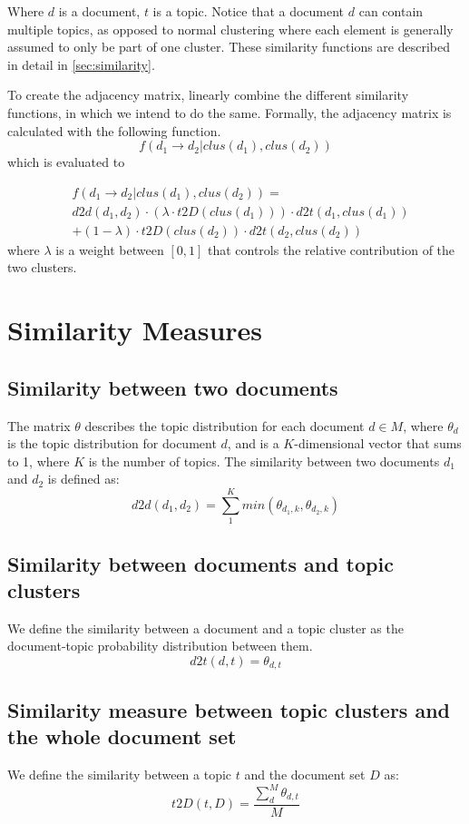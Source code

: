 \noindent
Where $d$ is a document, $t$ is a topic.
Notice that a document $d$ can contain multiple topics, as opposed to normal clustering where each element is generally assumed to only be part of one cluster.
These similarity functions are described in detail in \autoref{sec:similarity}.

To create the adjacency matrix, \cite{ClusterPageRank} linearly combine the different similarity functions, in which we intend to do the same.
Formally, the adjacency matrix is calculated with the following function.
$$ f(d_1 \rightarrow d_2 | clus(d_1), clus(d_2)) $$
which is evaluated to 

\begin{align*}
&f(d_1 \rightarrow d_2 | clus(d_1), clus(d_2)) = \\
&d2d(d_1, d_2) \cdot (\lambda \cdot t2D(clus(d_1))) \cdot d2t(d_1, clus(d_1)) \\ 
&+ (1-\lambda) \cdot t2D(clus(d_2)) \cdot d2t(d_2, clus(d_2))
\end{align*}
where $\lambda$ is a weight between $[0,1]$ that controls the relative contribution of the two clusters.


\section{Similarity Measures}\label{sec:similarity} 
\subsection{Similarity between two documents}
The matrix $\theta$ describes the topic distribution for each document $d \in M$, where $\theta_d$ is the topic distribution for document $d$, and is a $K$-dimensional vector that sums to 1, where $K$ is the number of topics. 
The similarity between two documents $d_1$ and $d_2$ is defined as:
$$ d2d(d_1, d_2) = \sum_{1}^{K} min(\theta_{d_1,k}, \theta_{d_2,k})$$

\subsection{Similarity between documents and topic clusters}
We define the similarity between a document and a topic cluster as the document-topic probability distribution between them.
$$ d2t(d,t) = \theta_{d,t}$$

\subsection{Similarity measure between topic clusters and the whole document set}
We define the similarity between a topic $t$ and the document set $D$ as:
$$ t2D(t, D) = \frac{\sum_{d}^{M} \theta_{d,t}}{M} $$
